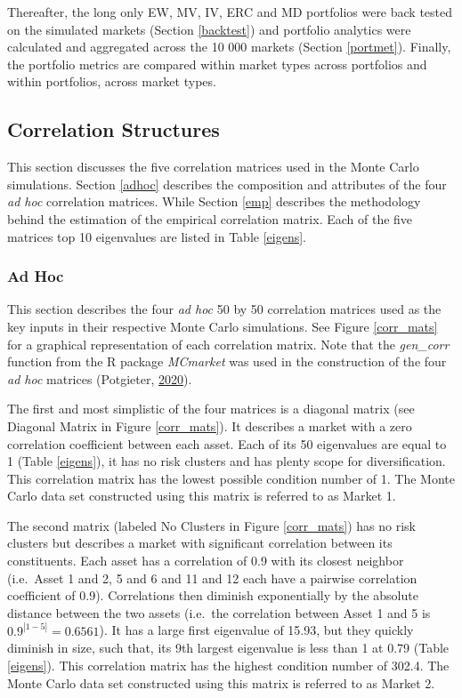 \documentclass[11pt,preprint, authoryear]{elsarticle}
\numberwithin{equation}{section}
\numberwithin{figure}{section}
\numberwithin{table}{section}
\begin{document}
Thereafter, the long only EW, MV, IV, ERC and MD portfolios were back
tested on the simulated markets (Section \ref{backtest}) and portfolio
analytics were calculated and aggregated across the 10 000 markets
(Section \ref{portmet}). Finally, the portfolio metrics are compared
within market types across portfolios and within portfolios, across
market types.

\hypertarget{correlation-structures}{%
\subsection{\texorpdfstring{Correlation Structures
\label{corr_struc}}{Correlation Structures }}\label{correlation-structures}}

This section discusses the five correlation matrices used in the Monte
Carlo simulations. Section \ref{adhoc} describes the composition and
attributes of the four \emph{ad hoc} correlation matrices. While Section
\ref{emp} describes the methodology behind the estimation of the
empirical correlation matrix. Each of the five matrices top 10
eigenvalues are listed in Table \ref{eigens}.

\hypertarget{ad-hoc}{%
\subsubsection{\texorpdfstring{Ad Hoc
\label{adhoc}}{Ad Hoc }}\label{ad-hoc}}

This section describes the four \emph{ad hoc} 50 by 50 correlation
matrices used as the key inputs in their respective Monte Carlo
simulations. See Figure \ref{corr_mats} for a graphical representation
of each correlation matrix. Note that the \emph{gen\_corr} function from
the R package \emph{MCmarket} was used in the construction of the four
\emph{ad hoc} matrices (Potgieter,
\protect\hyperlink{ref-MCmarket}{2020}).

The first and most simplistic of the four matrices is a diagonal matrix
(see Diagonal Matrix in Figure \ref{corr_mats}). It describes a market
with a zero correlation coefficient between each asset. Each of its 50
eigenvalues are equal to 1 (Table \ref{eigens}), it has no risk clusters
and has plenty scope for diversification. This correlation matrix has
the lowest possible condition number of 1. The Monte Carlo data set
constructed using this matrix is referred to as Market 1.

The second matrix (labeled No Clusters in Figure \ref{corr_mats}) has no
risk clusters but describes a market with significant correlation
between its constituents. Each asset has a correlation of 0.9 with its
closest neighbor (i.e.~Asset 1 and 2, 5 and 6 and 11 and 12 each have a
pairwise correlation coefficient of 0.9). Correlations then diminish
exponentially by the absolute distance between the two assets (i.e.~the
correlation between Asset 1 and 5 is \(0.9^{|1-5|}=0.6561\)). It has a
large first eigenvalue of 15.93, but they quickly diminish in size, such
that, its 9th largest eigenvalue is less than 1 at 0.79 (Table
\ref{eigens}). This correlation matrix has the highest condition number
of 302.4. The Monte Carlo data set constructed using this matrix is
referred to as Market 2.
\end{document}
